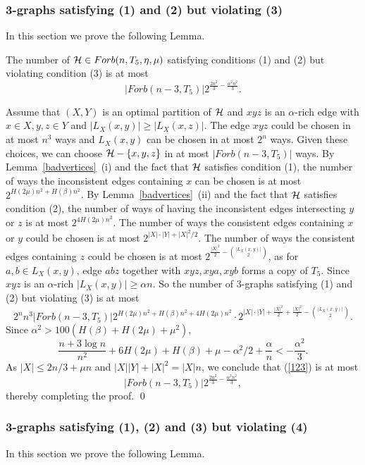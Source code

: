 \documentclass[11pt]{article}
\begin{document}
\subsubsection{3-graphs  satisfying (1) and (2) but violating
(3)}  In this section we prove the following Lemma.

\begin{lemma} \label{3}
The number of  $\mathcal{H} \in Forb(n,T_5,\eta,\mu)$ satisfying conditions (1) and (2) but violating condition (3)
is at most
$$|Forb(n-3,T_5)|2^{\frac{2n^2}{3} -\frac{\alpha^2n^2}{3}}.$$
\end{lemma}
\proof
 Assume that $(X,Y)$ is an optimal partition of
$\mathcal{H}$ and $xyz$ is an $\alpha$-rich edge with $x\in X, y,z\in
Y$ and $|L_X(x,y)|\ge |L_X(x,z)|$. The edge $xyz$ could be chosen in
at most $n^3$ ways and $L_X(x,y)$ can be chosen in at most $2^n$
ways. Given these choices, we can choose $\mathcal{H}-\{x,y,z\}$ in at most
$|Forb(n-3,T_5)|$ ways. By Lemma~\ref{badvertices}~(i) and the fact
that $\mathcal{H}$ satisfies condition (1), the number of ways the
inconsistent edges  containing $x$ can be chosen is at most
$2^{H(2\mu)n^2+ H(\beta) n^2}$. By Lemma~\ref{badvertices}~(ii) and the fact that $\mathcal{H}$ satisfies condition (2), the number of ways of having the
inconsistent edges intersecting $y$ or $z$ is at most $2^{4H(2\mu)n^2}$. The number of
ways the consistent edges containing $x$ or $y$ could be chosen is at
most $2^{|X|\cdot|Y|+{|X|^2}/{2}}$.
The number of
ways the consistent edges containing
 $z$ could be chosen is at most
$2^{\frac{|X|^2}{2}-{|L_X(x,y)|\choose 2}}$, as for $a,b\in
L_X(x,y)$, edge $abz$ together  with $xyz,xya,xyb$
 forms a copy of $T_5$. Since  $xyz$ is an $\alpha$-rich   $|L_X(x,y)|\ge \alpha n.$
 So the number of 3-graphs satisfying (1) and (2) but violating (3) is at most
\begin{equation} \label{123} 2^nn^3|Forb(n-3,T_5)|2^{H(2\mu)n^2+ H(\beta)n^2+4H(2\mu)n^2}
\cdot 2^{|X|  \cdot
|Y|+\frac{|X|^2}{2}+\frac{|X|^2}{2}-{|L_X(x,y)|\choose 2}}.\end{equation}
 Since $\alpha^2>100(H(\beta)+H(2\mu) +\mu^2)$,
 $$\frac{n+3\log n}{n^2}+  6 H(2\mu)+H(\beta)+\mu- \alpha^2/2+ \frac{\alpha}{n} <-\frac{\alpha^2}{3}.$$
  As $|X|\le 2n/3+\mu n$ and $|X||Y|+|X|^2=|X|n$, we conclude that (\ref{123}) is at most
\begin{equation}\label{partiii}
 |Forb(n-3,T_5)|2^{\frac{2n^2}{3} -\frac{\alpha^2n^2}{3}},
\end{equation} thereby completing the proof. \qed


\subsubsection{3-graphs  satisfying (1), (2) and (3) but violating
(4)}  In this section we prove the following Lemma.
\end{document}
